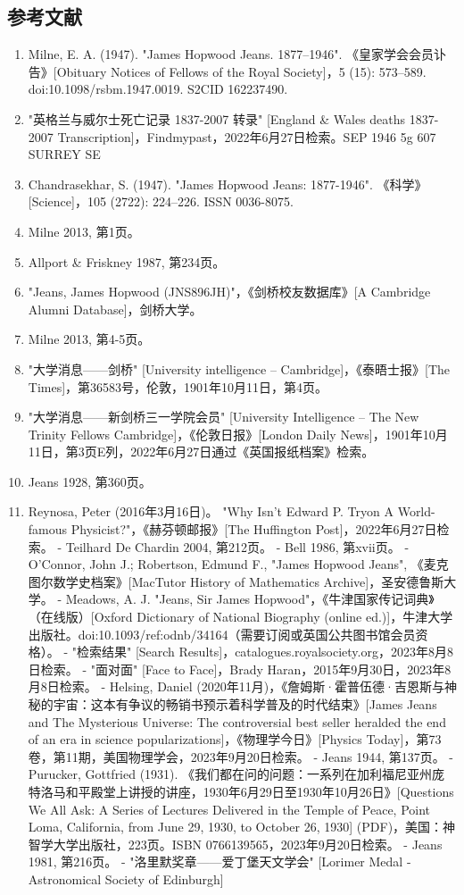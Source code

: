 \subsection{参考文献}  
\begin{enumerate}
\item Milne, E. A. (1947). "James Hopwood Jeans. 1877–1946". 《皇家学会会员讣告》[Obituary Notices of Fellows of the Royal Society]，5 (15): 573–589. doi:10.1098/rsbm.1947.0019. S2CID 162237490.  
\item "英格兰与威尔士死亡记录 1837-2007 转录" [England & Wales deaths 1837-2007 Transcription]，Findmypast，2022年6月27日检索。SEP 1946 5g 607 SURREY SE  
\item Chandrasekhar, S. (1947). "James Hopwood Jeans: 1877-1946". 《科学》[Science]，105 (2722): 224–226. ISSN 0036-8075.  
\item Milne 2013, 第1页。  
\item Allport & Friskney 1987, 第234页。  
\item "Jeans, James Hopwood (JNS896JH)"，《剑桥校友数据库》[A Cambridge Alumni Database]，剑桥大学。  
\item Milne 2013, 第4-5页。  
\item "大学消息——剑桥" [University intelligence – Cambridge]，《泰晤士报》[The Times]，第36583号，伦敦，1901年10月11日，第4页。  
\item "大学消息——新剑桥三一学院会员" [University Intelligence – The New Trinity Fellows Cambridge]，《伦敦日报》[London Daily News]，1901年10月11日，第3页E列，2022年6月27日通过《英国报纸档案》检索。  
\item Jeans 1928, 第360页。  
\item Reynosa, Peter (2016年3月16日)。 "Why Isn't Edward P. Tryon A World-famous Physicist?"，《赫芬顿邮报》[The Huffington Post]，2022年6月27日检索。  
- Teilhard De Chardin 2004, 第212页。  
- Bell 1986, 第xvii页。  
- O'Connor, John J.; Robertson, Edmund F., "James Hopwood Jeans", 《麦克图尔数学史档案》[MacTutor History of Mathematics Archive]，圣安德鲁斯大学。  
- Meadows, A. J. "Jeans, Sir James Hopwood"，《牛津国家传记词典》（在线版）[Oxford Dictionary of National Biography (online ed.)]，牛津大学出版社。doi:10.1093/ref:odnb/34164（需要订阅或英国公共图书馆会员资格）。  
- "检索结果" [Search Results]，catalogues.royalsociety.org，2023年8月8日检索。  
- "面对面" [Face to Face]，Brady Haran，2015年9月30日，2023年8月8日检索。  
- Helsing, Daniel (2020年11月)，《詹姆斯·霍普伍德·吉恩斯与神秘的宇宙：这本有争议的畅销书预示着科学普及的时代结束》[James Jeans and The Mysterious Universe: The controversial best seller heralded the end of an era in science popularizations]，《物理学今日》[Physics Today]，第73卷，第11期，美国物理学会，2023年9月20日检索。  
- Jeans 1944, 第137页。  
- Purucker, Gottfried (1931). 《我们都在问的问题：一系列在加利福尼亚州庞特洛马和平殿堂上讲授的讲座，1930年6月29日至1930年10月26日》[Questions We All Ask: A Series of Lectures Delivered in the Temple of Peace, Point Loma, California, from June 29, 1930, to October 26, 1930] (PDF)，美国：神智学大学出版社，223页。ISBN 0766139565，2023年9月20日检索。  
- Jeans 1981, 第216页。  
- "洛里默奖章——爱丁堡天文学会" [Lorimer Medal - Astronomical Society of Edinburgh]
\end{enumerate}